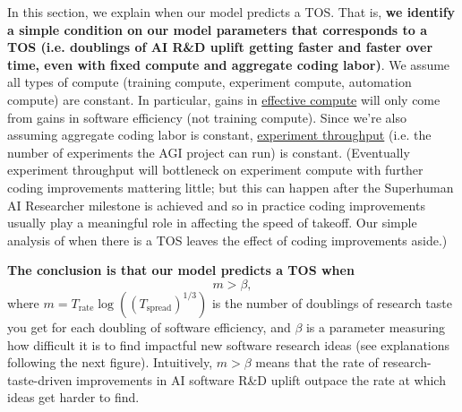 \documentclass{article}
\theoremstyle{definition}
\newcommand{\ESUG}[1]{\textcolor{purple}{ELI-SUGGESTION: #1}}
\begin{document}

In this section, we explain when our model predicts a TOS. That is, \textbf{we identify a simple condition on our model parameters that corresponds to a TOS (i.e. doublings of AI R\&D uplift getting faster and faster over time, even with fixed compute and aggregate coding labor)}. We assume all types of compute (training compute, experiment compute, automation compute) are constant. In particular, gains in \hyperref[Effective compute]{effective compute} will only come from gains in software efficiency (not training compute). Since we're also assuming aggregate coding labor is constant, \hyperref[Experiment throughput]{experiment throughput} (i.e. the number of experiments the AGI project can run) is constant. (Eventually experiment throughput will bottleneck on experiment compute with further coding improvements mattering little; but this can happen after the Superhuman AI Researcher milestone is achieved and so in practice coding improvements usually play a meaningful role in affecting the speed of takeoff. Our simple analysis of when there is a TOS leaves the effect of coding improvements aside.)


\textbf{The conclusion is that our model predicts a TOS when}
\[m > \beta,\]
where $m = T_\text{rate} \log\left(\left(T_\text{spread}\right)^{1/3}\right)$ is the number of doublings of research taste you get for each doubling of software efficiency, and $\beta$ is a parameter measuring how difficult it is to find impactful new software research ideas (see explanations following the next figure). Intuitively, $m > \beta$ means that the rate of research-taste-driven improvements in AI software R\&D uplift outpace the rate at which ideas get harder to find.
\end{document}
